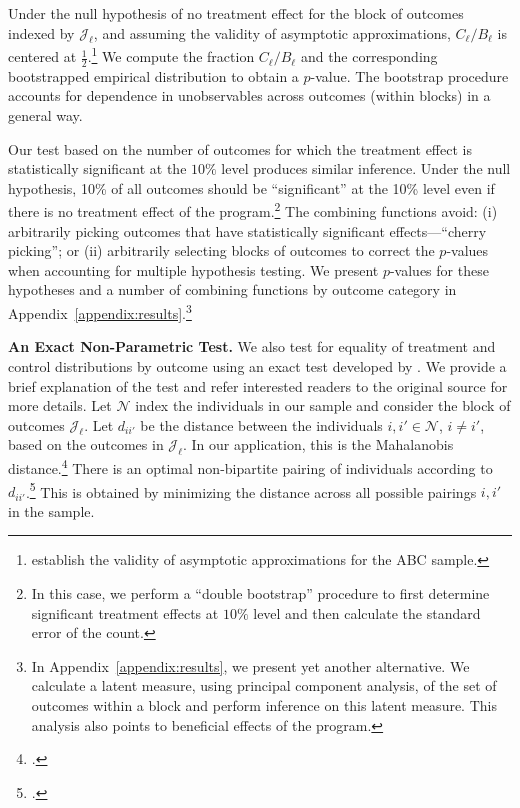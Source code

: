 Under the null hypothesis of no treatment effect for the block of outcomes indexed by $\mathcal{J}_\ell$, and assuming the validity of asymptotic approximations, $C_\ell / B_\ell$ is centered at $\frac{1}{2}$.\footnote{\citet{Campbell_Conti_etal_2014_EarlyChildhoodInvestments} establish the validity of asymptotic approximations for the ABC sample.} We compute the fraction $C_\ell / B_\ell$ and the corresponding bootstrapped empirical distribution to obtain a $p$-value. The bootstrap procedure accounts for dependence in unobservables across outcomes (within blocks) in a general way.

Our test based on the number of outcomes for which the treatment effect is statistically significant at the $10\%$ level produces similar inference. Under the null hypothesis, 10\% of all outcomes should be ``significant'' at the 10\% level even if there is no treatment effect of the program.\footnote{In this case, we perform a ``double bootstrap'' procedure to first determine significant treatment effects at $10\%$ level and then calculate the standard error of the count.} The combining functions avoid: (i) arbitrarily picking outcomes that have statistically significant effects---``cherry picking''; or (ii) arbitrarily selecting blocks of outcomes to correct the $p$-values when accounting for multiple hypothesis testing. We present $p$-values for these hypotheses and a number of combining functions by outcome category in Appendix~\ref{appendix:results}.\footnote{In Appendix~\ref{appendix:results}, we present yet another alternative. We calculate a latent measure, using principal component analysis, of the set of outcomes within a block and perform inference on this latent measure. This analysis also points to beneficial effects of the program.}

\textbf{An Exact Non-Parametric Test.} We also test for equality of treatment and control distributions by outcome using an exact test developed by \citet{Rosenbaum_2005_Distribution_JRSS}. We provide a brief explanation of the test and refer interested readers to the original source for more details. Let $\mathcal{N}$ index the individuals in our sample and consider the block of outcomes $\mathcal{J}_\ell$. Let $d_{ii'}$ be the distance between the individuals $i, i' \in \mathcal{N}$, $i \neq i'$, based on the outcomes in $\mathcal{J}_\ell$. In our application, this is the Mahalanobis distance.\footnote{\citet{Mahalanobis_1936_PNISI}.} There is an optimal non-bipartite pairing of individuals according to $d_{ii'}$.\footnote{\citet{Derigs_1988_Solving_AOR}.} This is obtained by minimizing the distance across all possible pairings $i, i'$ in the sample.

